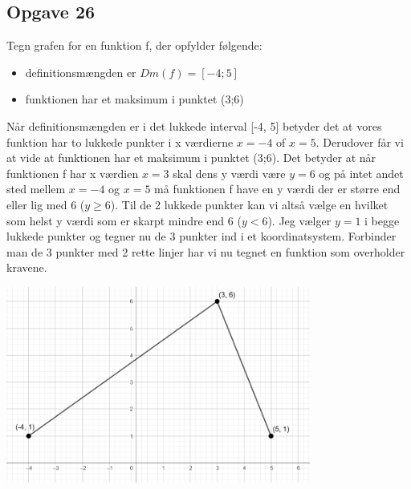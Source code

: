 \subsection{Opgave 26}

Tegn grafen for en funktion f, der opfylder følgende:
\begin{itemize}
    \item definitionsmængden er $Dm(f) = [-4;5]$
    \item funktionen har et maksimum i punktet (3;6)
\end{itemize}

\ans

Når definitionsmængden er i det lukkede interval [-4, 5] betyder det at vores funktion har to lukkede punkter
i x værdierne $x = -4$ of $x = 5$. Derudover får vi at vide at funktionen har et maksimum i punktet (3;6).
Det betyder at når funktionen f har x værdien $x = 3$ skal dens y værdi være 
$y = 6$ og på intet andet sted mellem $x = -4$ og $x = 5$ må funktionen f
have en y værdi der er større end eller lig med 6 ($y \geq 6$).
Til de 2 lukkede punkter kan vi altså vælge en hvilket som helst y værdi som er skarpt mindre end 6 ($y < 6$).
Jeg vælger $y = 1$ i begge lukkede punkter og tegner nu de 3 punkter ind i et koordinatsystem.
Forbinder man de 3 punkter med 2 rette linjer har vi nu tegnet en funktion som overholder kravene.

\includegraphics[width=10cm]{Opgave_21-30/Opgave_26/26.png}






